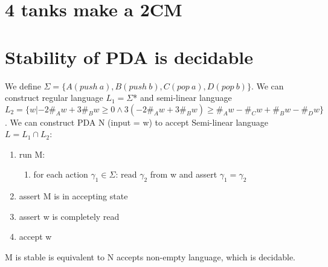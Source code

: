 \documentclass{article}
\begin{document}
\section{4 tanks make a 2CM}

\section{Stability of PDA is decidable}
We define $ \Sigma = \{A(push \ a), B(push \ b), C(pop \ a), D(pop \ b)\} $.
We can construct regular language $ L_1 = \Sigma $* and semi-linear language $ 
L_2 = \{w | -2\#_Aw + 3\#_Bw \ge 0 \land 3(-2\#_Aw + 3\#_Bw) \ge \#_Aw-\#_Cw + 
\#_Bw-\#_Dw\} $. We can construct PDA N (input = w) to accept Semi-linear 
language $ L = L_1 \cap L_2 $:
\begin{enumerate}
	\item run M:
	\begin{enumerate}
		\item for each action $ \gamma_1 \in \Sigma $: read $ \gamma_2 $ 
		from w and assert $ \gamma_1 = \gamma_2 $
	\end{enumerate}
	\item assert M is in accepting state
	\item assert w is completely read
	\item accept w
\end{enumerate}
M is stable is equivalent to N accepts non-empty language, which is decidable.
\end{document}
